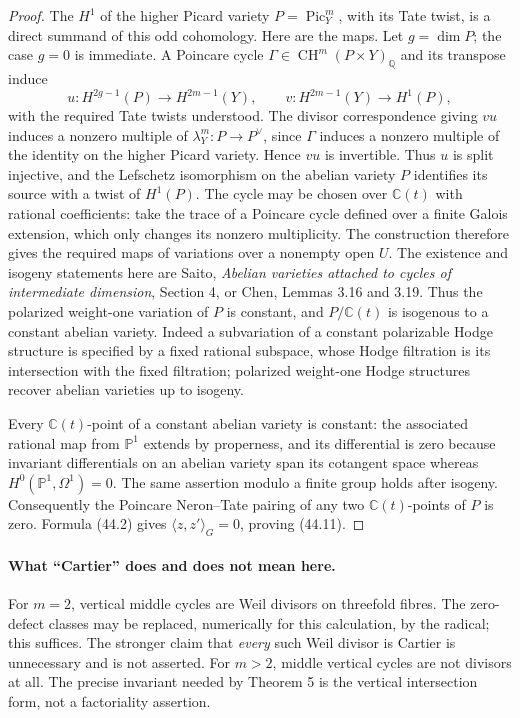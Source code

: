 \documentclass[11pt,a4paper]{article}
\theoremstyle{definition}
\theoremstyle{remark}
\begin{document}
\begin{proof}
The $H^1$ of the higher Picard variety $P=\operatorname{Pic}^m_Y$,
with its Tate twist, is a direct summand of this odd cohomology.
Here are the maps.  Let $g=\dim P$; the case $g=0$ is immediate.
A Poincare cycle $\Gamma\in\operatorname{CH}^{m}(P\times Y)_{\mathbb Q}$
and its transpose induce
\[
 u:H^{2g-1}(P)\longrightarrow H^{2m-1}(Y),\qquad
 v:H^{2m-1}(Y)\longrightarrow H^1(P),
\]
with the required Tate twists understood.  The divisor
correspondence giving $vu$ induces a nonzero multiple of
$\lambda_Y^m:P\to P^\vee$, since $\Gamma$ induces a nonzero
multiple of the identity on the higher Picard variety.  Hence
$vu$ is invertible.  Thus $u$ is split injective, and the
Lefschetz isomorphism on the abelian variety $P$ identifies its
source with a twist of $H^1(P)$.  The cycle may be chosen over
$\mathbb C(t)$ with rational coefficients: take the trace of a
Poincare cycle defined over a finite Galois extension, which only
changes its nonzero multiplicity.  The construction therefore
gives the required maps of variations over a nonempty open $U$.
The existence and isogeny statements here are Saito,
\emph{Abelian varieties attached to cycles of intermediate
dimension}, Section 4, or Chen, Lemmas 3.16 and 3.19.
Thus the polarized weight-one variation of $P$ is constant, and
$P/\mathbb C(t)$ is isogenous to a constant abelian variety.
Indeed a subvariation of a constant polarizable Hodge structure
is specified by a fixed rational subspace, whose Hodge filtration
is its intersection with the fixed filtration; polarized weight-one
Hodge structures recover abelian varieties up to isogeny.

Every $\mathbb C(t)$-point of a constant abelian variety is constant:
the associated rational map from $\mathbb P^1$ extends by properness,
and its differential is zero because invariant differentials on
an abelian variety span its cotangent space whereas
$H^0(\mathbb P^1,\Omega^1)=0$.  The same assertion modulo a finite
group holds after isogeny.  Consequently the Poincare Neron--Tate
pairing of any two $\mathbb C(t)$-points of $P$ is zero.  Formula
(44.2) gives $\langle z,z'\rangle_G=0$, proving (44.11).
\end{proof}

\paragraph{What ``Cartier'' does and does not mean here.}
For $m=2$, vertical middle cycles are Weil divisors on threefold
fibres.  The zero-defect classes may be replaced, numerically for
this calculation, by the radical; this suffices.  The stronger
claim that \emph{every} such Weil divisor is Cartier is unnecessary
and is not asserted.  For $m>2$, middle vertical cycles are not
divisors at all.  The precise invariant needed by Theorem 5 is
the vertical intersection form, not a factoriality assertion.
\end{document}
